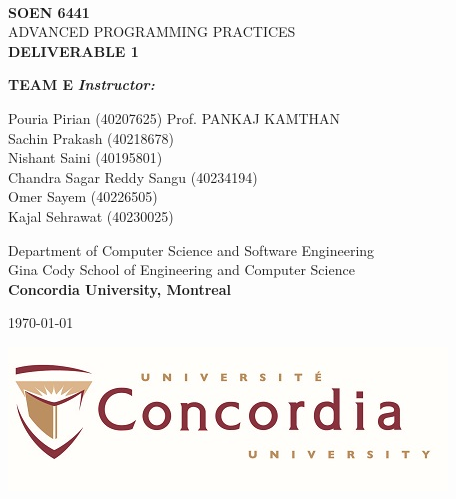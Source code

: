 \documentclass{report}
\begin{document}
\begin{titlepage}
  \begin{center}
    \textbf{\Large\\ SOEN 6441}
    \vspace{1cm}
    \Huge\\ ADVANCED PROGRAMMING PRACTICES
    \vspace{1cm}
    \textbf{\Huge\\DELIVERABLE 1}\\
    \vspace{2cm}

    \Large \textbf{TEAM E} \hfill  \textit{\textbf{Instructor:}}\\
    \begin{large}
      \begin{flushleft}
        \vspace{.1cm}
        Pouria Pirian (40207625) \hfill Prof. PANKAJ KAMTHAN\\
        Sachin Prakash (40218678)\\
        Nishant	Saini (40195801)\\
        Chandra Sagar Reddy	Sangu (40234194)\\
        Omer Sayem (40226505)\\
        Kajal Sehrawat (40230025)\\
      \end{flushleft}
    \end{large}

    \begin{Large}  
      \vspace{1 cm}
      Department of Computer Science and Software Engineering \\
      Gina Cody School of Engineering and Computer Science \\
      \textbf{Concordia University, Montreal}\\
      \vspace{1 cm}

      \today \\
    \end{Large}
  \end{center}

  \vfill
  \begin{center}
    \includegraphics[width = 50ex]{resources/concordia_med.jpg}
  \end{center}
  
\end{titlepage}
\end{document}
